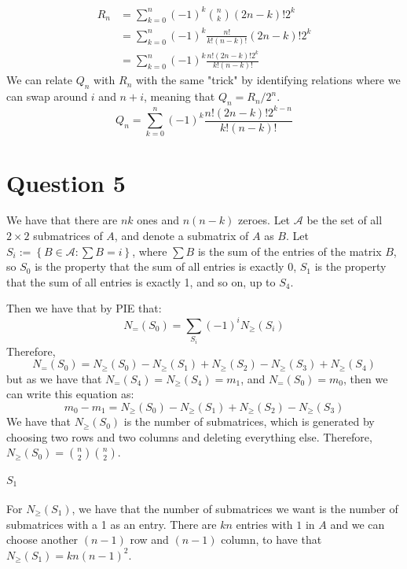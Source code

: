 \documentclass[]{article}
\begin{document}
\begin{align*}
	R_n &=  \sum_{k = 0}^n (-1)^k \binom{n}{k} (2n - k)!2^k\\ 
	&=  \sum_{k = 0}^n (-1)^k \frac{n!}{k! (n - k)!} (2n - k)!2^k\\
	&= \sum_{k = 0}^n (-1)^k \frac{n!(2n - k)! 2^k}{k! (n - k)!}
\end{align*}
We can relate $Q_n$ with $R_n$ with the same "trick" by identifying relations where we can swap around $i$ and $n+ i$, meaning that $Q_n = R_n/2^n$. 
\begin{equation}
	Q_n = \sum_{k = 0}^n (-1)^k \frac{n!(2n - k)! 2^{k - n}}{k! (n - k)!}
\end{equation}
\section{Question 5}
We have that there are $nk$ ones and $n(n-k)$ zeroes. 
Let $\mathcal{A}$ be the set of all $2 \times 2$ submatrices of $A$, and denote a submatrix of $A$ as $B$. Let $S_i := \left\lbrace B \in \mathcal{A}: \sum B = i \right \rbrace$, where $\sum B$ is the sum of the entries of the matrix $B$, so $S_0$ is the property that the sum of all entries is exactly 0, $S_1$ is the property that the sum of all entries is exactly 1, and so on, up to $S_4$.

Then we have that by PIE that:
\begin{equation}
	N_{=}(S_0) = \sum_{S_i}(-1)^{i} N_{\geq}(S_i) 
\end{equation}
Therefore, 
\begin{equation}
	N_{=}(S_0) = N_{\geq}(S_0) - N_{\geq}(S_1) + N_{\geq}(S_2) - N_{\geq}(S_3) + N_{\geq}(S_4)    
\end{equation}
but as we have that $N_{=}(S_4) = N_{\geq}(S_4) = m_1$, and $N_{=}(S_0) = m_0$, then we can write this equation as:
\begin{equation}
	m_0 - m_1 = N_{\geq}(S_0) - N_{\geq}(S_1) + N_{\geq}(S_2) - N_{\geq}(S_3)    
\end{equation}
We have that $N_{\geq}(S_0)$ is the number of submatrices, which is generated by choosing two rows and two columns and deleting everything else. Therefore, $N_{\geq}(S_0) = \binom{n}{2}\binom{n}{2}$.
\paragraph{$S_1$}
For $N_{\geq}(S_1)$, we have that the number of submatrices we want is the number of submatrices with a 1 as an entry. There are $kn$ entries with $1$ in $A$ and we can choose another $(n-1)$ row and $(n-1)$ column, to have that $N_{\geq}(S_1) = kn(n-1)^2$.
\end{document}
